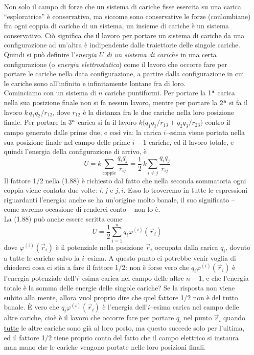 Non solo il campo di forze che un sistema di cariche fisse esercita su una carica ``esploratrice'' è conservativo, ma siccome sono conservative le forze (coulombiane) fra ogni coppia di cariche di un sistema, un insieme di cariche è un sistema conservativo. Ciò significa che il lavoro per portare un sistema di cariche da una configurazione ad un'altra è indipendente dalle traiettorie delle singole cariche.\\
Quindi si può definire l'\emph{energia $U$ di un sistema di cariche} in una certa configurazione (o \emph{energia elettrostatica}) come il lavoro che occorre fare per portare le cariche nella data configurazione, a partire dalla configurazione in cui le cariche sono all'infinito e infinitamente lontane fra di loro.\\
Cominciamo con un sistema di $n$ cariche puntiformi. Per portare la 1$^{\rm a}$ carica nella sua posizione finale non si fa nessun lavoro, mentre per portare la 2$^{\rm a}$ si fa il lavoro $k\,q_1q_2/r_{12}$, dove $r_{12}$ è la distanza fra le due cariche nella loro posizione finale. Per portare la 3$^{\rm a}$ carica si fa il lavoro $k\big(q_1q_3/r_{13}+q_2q_3/r_{23}\big)$ contro il campo generato dalle prime due, e così via: la carica $i$--esima viene portata nella sua posizione finale nel campo delle prime $i-1$ cariche, ed il lavoro totale, e quindi l'energia della configurazione di arrivo, è
\begin{equation}
U=k\sum_{\text{coppie}}\frac{q_iq_j}{r_{ij}}=\frac12\,k\sum_{i\neq j}\frac{q_iq_j}{r_{ij}}
\tag{1.88}
\end{equation}
Il fattore 1/2 nella (1.88) è richiesto dal fatto che nella seconda sommatoria ogni coppia viene contata due volte: $i,j$ e $j,i$. Esso lo troveremo in tutte le espressioni riguardanti l'energia: anche se ha un'origine molto banale, il suo significato -- come avremo occasione di renderci conto -- non lo è.\\
La (1.88) può anche essere scritta come
\begin{equation}
U=\frac12\sum_{i=1}^nq_i\varphi^{(i)}(\vec r_i)
\tag{1.89}
\end{equation}
dove $\varphi^{(i)}(\vec r_i)$ è il potenziale nella posizione $\vec r_i$ occupata dalla carica $q_i$, dovuto a tutte le cariche salvo la $i$--esima. A questo punto ci potrebbe venir voglia di chiederci cosa ci stia a fare il fattore 1/2: non è forse vero che $q_i\varphi^{(i)}(\vec r_i)$ è l'energia potenziale dell'$i$--esima carica nel campo delle altre $n-1$, e che l'energia totale è la somma delle energie delle singole cariche? Se la risposta non viene subito alla mente, allora vuol proprio dire che quel fattore 1/2 non è del tutto banale. È vero che $q_i\varphi^{(i)}(\vec r_i)$ è l'energia dell'$i$--esima carica nel campo delle altre cariche, cioè è il lavoro che occorre fare per portare $q_i$ nel punto $\vec r_i$ quando \underline{tutte} le altre cariche sono già al loro posto, ma questo succede solo per l'ultima, ed il fattore 1/2 tiene proprio conto del fatto che il campo elettrico si instaura man mano che le cariche vengono portate nelle loro posizioni finali.\\
